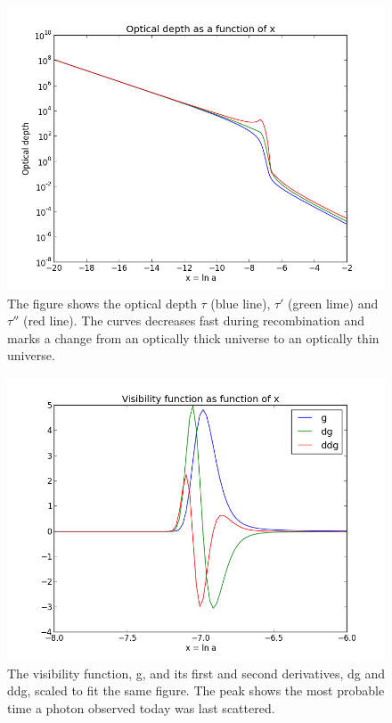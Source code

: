 \documentclass[norsk,a4paper,12pt]{article}
\begin{document}
\begin{figure}[H] 
\begin{center} 
\includegraphics[scale=0.5]{tau.png} 
 

\caption{The figure shows the optical depth $\tau$ (blue line), $\tau'$ (green lime) and $\tau''$ (red line). The curves decreases fast during recombination and marks a change from an optically thick universe to an optically thin universe.} 
\end{center} 
\end{figure}


\begin{figure}[H] 
\begin{center} 
\includegraphics[scale=0.5]{g.png} 
 

\caption{The visibility function, g, and its first and second derivatives, dg and ddg, scaled to fit the same figure. The peak shows the most probable time a photon observed today was last scattered. } 
\end{center} 
\end{figure}
\end{document}
